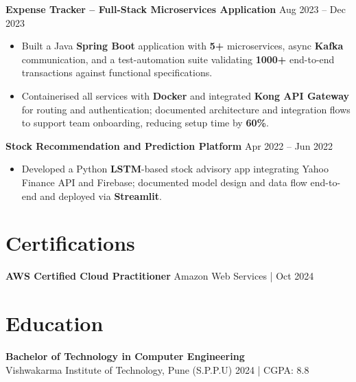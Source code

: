 \documentclass[letterpaper,10pt]{article}
\begin{document}
\textbf{Expense Tracker -- Full-Stack Microservices Application} \hfill Aug 2023 -- Dec 2023
\begin{itemize}[leftmargin=*]
    \item Built a Java \textbf{Spring Boot} application with \textbf{5+} microservices, async \textbf{Kafka} communication, and a test-automation suite validating \textbf{1000+} end-to-end transactions against functional specifications.
    \item Containerised all services with \textbf{Docker} and integrated \textbf{Kong API Gateway} for routing and authentication; documented architecture and integration flows to support team onboarding, reducing setup time by \textbf{60\%}.
\end{itemize}
\textbf{Stock Recommendation and Prediction Platform} \hfill Apr 2022 -- Jun 2022
\begin{itemize}[leftmargin=*]
    \item Developed a Python \textbf{LSTM}-based stock advisory app integrating Yahoo Finance API and Firebase; documented model design and data flow end-to-end and deployed via \textbf{Streamlit}.
\end{itemize}

\section*{Certifications}
\textbf{AWS Certified Cloud Practitioner} \hfill Amazon Web Services \;|\; Oct 2024 \\

\section*{Education}

\textbf{Bachelor of Technology in Computer Engineering} \\
Vishwakarma Institute of Technology, Pune (S.P.P.U) \hfill 2024 \;|\; CGPA: 8.8
\end{document}
